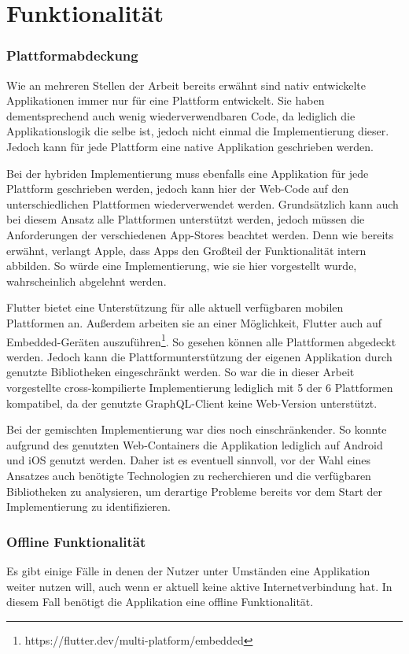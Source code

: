 \section{Funktionalität}

\subsubsection{Plattformabdeckung}
Wie an mehreren Stellen der Arbeit bereits erwähnt sind nativ entwickelte Applikationen immer nur für eine Plattform entwickelt. Sie haben dementsprechend auch wenig wiederverwendbaren Code, da lediglich die Applikationslogik die selbe ist, jedoch nicht einmal die Implementierung dieser. Jedoch kann für jede Plattform eine native Applikation geschrieben werden.

Bei der hybriden Implementierung muss ebenfalls eine Applikation für jede Plattform geschrieben werden, jedoch kann hier der Web-Code auf den unterschiedlichen Plattformen wiederverwendet werden. Grundsätzlich kann auch bei diesem Ansatz alle Plattformen unterstützt werden, jedoch müssen die Anforderungen der verschiedenen App-Stores beachtet werden. Denn wie bereits erwähnt, verlangt Apple, dass Apps den Großteil der Funktionalität intern abbilden. So würde eine Implementierung, wie sie hier vorgestellt wurde, wahrscheinlich abgelehnt werden.

Flutter bietet eine Unterstützung für alle aktuell verfügbaren mobilen Plattformen an. Außerdem arbeiten sie an einer Möglichkeit, Flutter auch auf Embedded-Geräten auszuführen\footnote{https://flutter.dev/multi-platform/embedded}.
So gesehen können alle Plattformen abgedeckt werden. Jedoch kann die Plattformunterstützung der eigenen Applikation durch genutzte Bibliotheken eingeschränkt werden. So war die in dieser Arbeit vorgestellte cross-kompilierte Implementierung lediglich mit 5 der 6 Plattformen kompatibel, da der genutzte GraphQL-Client keine Web-Version unterstützt. 

Bei der gemischten Implementierung war dies noch einschränkender. So konnte aufgrund des genutzten Web-Containers die Applikation lediglich auf Android und iOS genutzt werden.
Daher ist es eventuell sinnvoll, vor der Wahl eines Ansatzes auch benötigte Technologien zu recherchieren und die verfügbaren Bibliotheken zu analysieren, um derartige Probleme bereits vor dem Start der Implementierung zu identifizieren.


\subsubsection{Offline Funktionalität}
Es gibt einige Fälle in denen der Nutzer unter Umständen eine Applikation weiter nutzen will, auch wenn er aktuell keine aktive Internetverbindung hat. In diesem Fall benötigt die Applikation eine offline Funktionalität.

